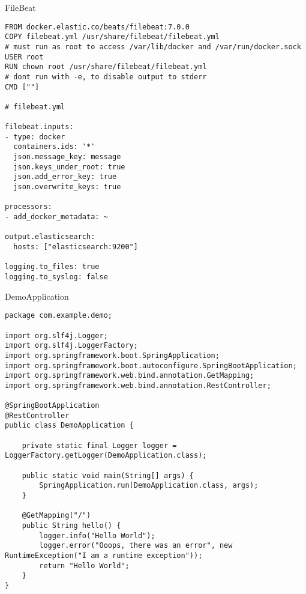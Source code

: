 \documentclass[12pt,a4paper]{article}
\begin{document}
FileBeat
\begin{lstlisting}
FROM docker.elastic.co/beats/filebeat:7.0.0
COPY filebeat.yml /usr/share/filebeat/filebeat.yml
# must run as root to access /var/lib/docker and /var/run/docker.sock
USER root
RUN chown root /usr/share/filebeat/filebeat.yml
# dont run with -e, to disable output to stderr
CMD [""]

# filebeat.yml

filebeat.inputs:
- type: docker
  containers.ids: '*'
  json.message_key: message
  json.keys_under_root: true
  json.add_error_key: true
  json.overwrite_keys: true

processors:
- add_docker_metadata: ~

output.elasticsearch:
  hosts: ["elasticsearch:9200"]

logging.to_files: true
logging.to_syslog: false

\end{lstlisting}

DemoApplication
\begin{lstlisting}
package com.example.demo;

import org.slf4j.Logger;
import org.slf4j.LoggerFactory;
import org.springframework.boot.SpringApplication;
import org.springframework.boot.autoconfigure.SpringBootApplication;
import org.springframework.web.bind.annotation.GetMapping;
import org.springframework.web.bind.annotation.RestController;

@SpringBootApplication
@RestController
public class DemoApplication {

	private static final Logger logger = LoggerFactory.getLogger(DemoApplication.class);

	public static void main(String[] args) {
		SpringApplication.run(DemoApplication.class, args);
	}

	@GetMapping("/")
	public String hello() {
		logger.info("Hello World");
		logger.error("Ooops, there was an error", new RuntimeException("I am a runtime exception"));
		return "Hello World";
	}
}

\end{lstlisting}
\end{document}
